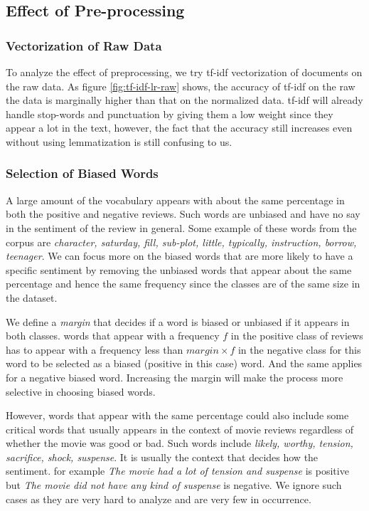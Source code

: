 \documentclass{article}
\begin{document}
	\subsection{Effect of Pre-processing}
	
	\subsubsection{Vectorization of Raw Data}
	
	To analyze the effect of preprocessing, we try tf-idf vectorization of documents on the raw data. As figure \ref{fig:tf-idf-lr-raw} shows, the accuracy of tf-idf on the raw the data is marginally higher than that on the normalized data. tf-idf will already handle stop-words and punctuation by giving them a low weight since they appear a lot in the text, however, the fact that the accuracy still increases even without using lemmatization is still confusing to us.
	
	\subsubsection{Selection of Biased Words}
	
	A large amount of the vocabulary appears with about the same percentage in both the positive and negative reviews. Such words are unbiased and have no say in the sentiment of the review in general. Some example of these words from the corpus are \textit{character, saturday, fill, sub-plot, little, typically, instruction, borrow, teenager}. We can focus more on the biased words that are more likely to have a specific sentiment by removing the unbiased words that appear about the same percentage and hence the same frequency since the classes are of the same size in the dataset.
	
	We define a \textit{margin} that decides if a word is biased or unbiased if it appears in both classes. words that appear with a frequency $f$ in the positive class of reviews has to appear with a frequency less than $margin\times f$ in the negative class for this word to be selected as a biased (positive in this case) word. And the same applies for a negative biased word. Increasing the margin will make the process more selective in choosing biased words.
	
	However, words that appear with the same percentage could also include some critical words that usually appears in the context of movie reviews regardless of whether the movie was good or bad. Such words include \textit{likely, worthy, tension, sacrifice, shock, suspense}. It is usually the context that decides how the sentiment. for example \textit{The movie had a lot of tension and suspense} is positive but \textit{The movie did not have any kind of suspense} is negative. We ignore such cases as they are very hard to analyze and are very few in occurrence.
	
\end{document}
